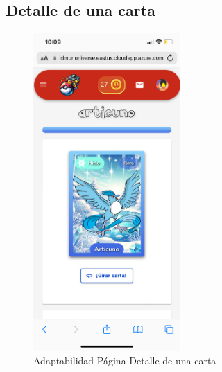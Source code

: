 \subsection*{Detalle de una carta}
\begin{figure}[H]
    \centering
    \includegraphics[width=0.5\textwidth]{figures/adaptabilidad/detalle_carta.png}
    \caption{Adaptabilidad Página Detalle de una carta}
    \label{fig:Adap-Carta}  
\end{figure}


